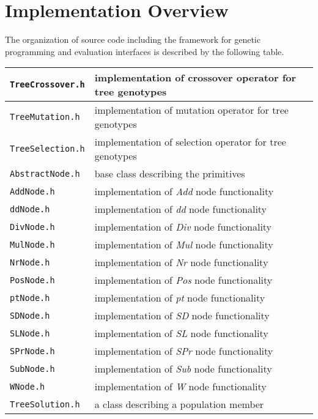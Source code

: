 \chapter{Implementation Overview}
\label{implementation}
The organization of source code including the framework for genetic programming and evaluation interfaces is described by the following table.
\begin{table}[H]
\begin{tabular}{|
>{\columncolor[HTML]{FFFFFF}}l |
>{\columncolor[HTML]{FFFFFF}}l |}
\hline
\texttt{TreeCrossover.h}    & implementation of crossover operator for tree genotypes \\ \hline
\texttt{TreeMutation.h}  & implementation of mutation operator for tree genotypes \\ \hline
\texttt{TreeSelection.h} & implementation of selection operator for tree genotypes  \\ \hline
\texttt{AbstractNode.h} & base class describing the primitives \\ \hline
\texttt{AddNode.h} & implementation of \textit{Add} node functionality \\ \hline
\texttt{ddNode.h} & implementation of \textit{dd} node functionality \\ \hline
\texttt{DivNode.h} & implementation of \textit{Div} node functionality \\ \hline
\texttt{MulNode.h} & implementation of \textit{Mul} node functionality \\ \hline
\texttt{NrNode.h} & implementation of \textit{Nr} node functionality  \\\hline
\texttt{PosNode.h} & implementation of \textit{Pos} node functionality \\ \hline
\texttt{ptNode.h} & implementation of \textit{pt} node functionality \\ \hline
\texttt{SDNode.h} & implementation of \textit{SD} node functionality \\ \hline
\texttt{SLNode.h} & implementation of \textit{SL} node functionality \\ \hline
\texttt{SPrNode.h} & implementation of \textit{SPr} node functionality \\ \hline
\texttt{SubNode.h} & implementation of \textit{Sub} node functionality \\ \hline
\texttt{WNode.h} & implementation of \textit{W} node functionality \\ \hline
\texttt{TreeSolution.h} & a class describing a population member \\ \hline

\end{tabular}
\end{table}
